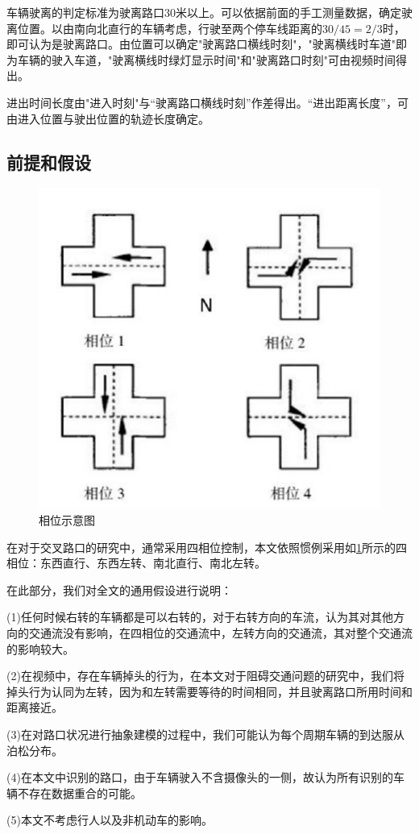 车辆驶离的判定标准为驶离路口30米以上。可以依据前面的手工测量数据，确定驶离位置。以由南向北直行的车辆考虑，行驶至两个停车线距离的$30/45=2/3$时，即可认为是驶离路口。由位置可以确定"驶离路口横线时刻"，"驶离横线时车道"即为车辆的驶入车道，"驶离横线时绿灯显示时间"和"驶离路口时刻"可由视频时间得出。

进出时间长度由"进入时刻"与“驶离路口横线时刻”作差得出。“进出距离长度”，可由进入位置与驶出位置的轨迹长度确定。

\subsection{前提和假设}\label{subsec:hypothesis-premise}

\begin{figure}[h]
    \centering
    \includegraphics[scale=0.5]{figures/四相相位图.png}
    \caption{相位示意图}
    \label{fig:相位}
\end{figure}

在对于交叉路口的研究中，通常采用四相位控制，本文依照惯例采用如\ref{fig:相位}所示的四相位：东西直行、东西左转、南北直行、南北左转。

在此部分，我们对全文的通用假设进行说明：

(1)任何时候右转的车辆都是可以右转的，对于右转方向的车流，认为其对其他方向的交通流没有影响，在四相位的交通流中，左转方向的交通流，其对整个交通流的影响较大。

(2)在视频中，存在车辆掉头的行为，在本文对于阻碍交通问题的研究中，我们将掉头行为认同为左转，因为和左转需要等待的时间相同，并且驶离路口所用时间和距离接近。

(3)在对路口状况进行抽象建模的过程中，我们可能认为每个周期车辆的到达服从泊松分布。

(4)在本文中识别的路口，由于车辆驶入不含摄像头的一侧，故认为所有识别的车辆不存在数据重合的可能。

(5)本文不考虑行人以及非机动车的影响。
